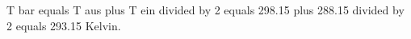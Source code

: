 T bar equals T aus plus T ein divided by 2 equals 298.15 plus 288.15 divided by 2 equals 293.15 Kelvin.